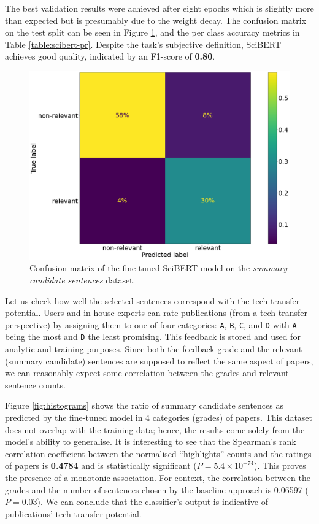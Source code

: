 The best validation results were achieved after eight epochs which is slightly more than expected but is presumably due to the weight decay. The confusion matrix on the test split can be seen in Figure \ref{fig:scibert-confusion}, and the per class accuracy metrics in Table \ref{table:scibert-pr}. Despite the task's subjective definition, SciBERT achieves good quality, indicated by an F1-score of \textbf{0.80}.

\begin{figure}
    \centering
    \includegraphics[width=0.55\linewidth]{figures/scibert-confusion.png}
    \captionsetup{width=.9\linewidth}
    \caption{Confusion matrix of the fine-tuned SciBERT model on the \textit{summary candidate sentences} dataset.}
    \label{fig:scibert-confusion}
\end{figure}

Let us check how well the selected sentences correspond with the tech-transfer potential. Users and in-house experts can rate publications (from a tech-transfer perspective) by assigning them to one of four categories: \texttt{A}, \texttt{B}, \texttt{C}, and \texttt{D} with \texttt{A} being the most and \texttt{D} the least promising. This feedback is stored and used for analytic and training purposes. Since both the feedback grade and the relevant (summary candidate) sentences are supposed to reflect the same aspect of papers, we can reasonably expect some correlation between the grades and relevant sentence counts.

Figure \ref{fig:histograms} shows the ratio of summary candidate sentences as predicted by the fine-tuned model in 4 categories (grades) of papers. This dataset does not overlap with the training data; hence, the results come solely from the model's ability to generalise. It is interesting to see that the Spearman's rank correlation coefficient \cite{spearman1961proof} between the normalised ``highlights'' counts and the ratings of papers is \textbf{0.4784} and is statistically significant ($P = 5.4 \times 10^{-74}$). This proves the presence of a monotonic association. For context, the correlation between the grades and the number of sentences chosen by the baseline approach is 0.06597 ($P = 0.03$). We can conclude that the classifier's output is indicative of publications' tech-transfer potential. 

